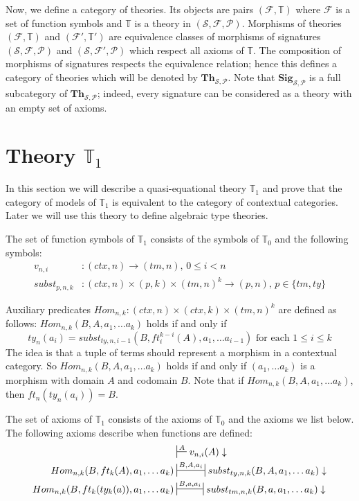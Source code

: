 \documentclass{amsart}
\theoremstyle{definition}
\theoremstyle{remark}
\newcommand{\cat}[1]{\mathbf{#1}}
\newcommand{\Sig}{\cat{Sig}}
\newcommand{\Th}{\cat{Th}}
\numberwithin{figure}{section}
\begin{document}
Now, we define a category of theories.
Its objects are pairs $(\mathcal{F},\mathbb{T})$ where $\mathcal{F}$ is a set of function symbols and $\mathbb{T}$ is a theory in $(\mathcal{S},\mathcal{F},\mathcal{P})$.
Morphisms of theories $(\mathcal{F},\mathbb{T})$ and $(\mathcal{F}',\mathbb{T}')$ are equivalence classes of morphisms of signatures $(\mathcal{S},\mathcal{F},\mathcal{P})$ and $(\mathcal{S},\mathcal{F}',\mathcal{P})$ which respect all axioms of $\mathbb{T}$.
The composition of morphisms of signatures respects the equivalence relation; hence this defines a category of theories which will be denoted by $\Th_{\mathcal{S},\mathcal{P}}$.
Note that $\Sig_{\mathcal{S},\mathcal{P}}$ is a full subcategory of $\Th_{\mathcal{S},\mathcal{P}}$; indeed, every signature can be considered as a theory with an empty set of axioms.

\label{sec:T1}
\section{Theory $\mathbb{T}_1$}

In this section we will describe a quasi-equational theory $\mathbb{T}_1$ and prove that the category of models of $\mathbb{T}_1$ is equivalent to the category of contextual categories.
Later we will use this theory to define algebraic type theories.

The set of function symbols of $\mathbb{T}_1$ consists of the symbols of $\mathbb{T}_0$ and the following symbols:
\begin{align*}
v_{n,i}       & : (ctx,n) \to (tm,n) \text{, } 0 \leq i < n \\
subst_{p,n,k} & : (ctx,n) \times (p,k) \times (tm,n)^k \to (p,n) \text{, } p \in \{ tm, ty \}
\end{align*}

Auxiliary predicates $Hom_{n,k} : (ctx,n) \times (ctx,k) \times (tm,n)^k$ are defined as follows: $Hom_{n,k}(B, A, a_1, \ldots a_k)$ holds if and only if
\[ ty_n(a_i) = subst_{ty,n,i-1}(B, ft^{k-i}_i(A), a_1, \ldots a_{i-1}) \text{ for each } 1 \leq i \leq k \]
The idea is that a tuple of terms should represent a morphism in a contextual category.
So $Hom_{n,k}(B, A, a_1, \ldots a_k)$ holds if and only if $(a_1, \ldots a_k)$ is a morphism with domain $A$ and codomain $B$.
Note that if $Hom_{n,k}(B, A, a_1, \ldots a_k)$, then $ft_n(ty_n(a_i)) = B$.

The set of axioms of $\mathbb{T}_1$ consists of the axioms of $\mathbb{T}_0$ and the axioms we list below.
The following axioms describe when functions are defined:
\begin{align}
\label{ax:def-var}
                                             & \sststile{}{A}           v_{n,i}(A) \downarrow \\
\label{ax:def-Subst}
Hom_{n,k}(B, ft_k(A), a_1, \ldots a_k)       & \ssststile{}{B, A, a_i}  subst_{ty,n,k}(B, A, a_1, \ldots a_k) \downarrow \\
\label{ax:def-subst}
Hom_{n,k}(B, ft_k(ty_k(a)), a_1, \ldots a_k) & \ssststile{}{B, a, a_i}  subst_{tm,n,k}(B, a, a_1, \ldots a_k) \downarrow
\end{align}
\end{document}
